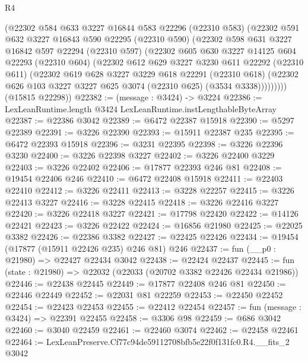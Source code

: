 \begin{lexlean}{R4}
\begin{coremodule}
        (@22302
          @584
          @633
          @3227
          @16844
          @583
          @22296
          (@22310 @583)
          (@22302
            @591
            @632
            @3227
            @16843
            @590
            @22295
            (@22310 @590)
            (@22302
              @598
              @631
              @3227
              @16842
              @597
              @22294
              (@22310 @597)
              (@22302
                @605
                @630
                @3227
                @14125
                @604
                @22293
                (@22310 @604)
                (@22302
                  @612
                  @629
                  @3227
                  @3230
                  @611
                  @22292
                  (@22310 @611)
                  (@22302
                    @619
                    @628
                    @3227
                    @3229
                    @618
                    @22291
                    (@22310 @618)
                    (@22302 @626 @103 @3227 @3227 @625 @3074 (@22310 @625) (@3534 @3338)))))))))
      (@15815 @22298))
@22382 := (message : @3424) -> @3224
@22386 := LexLeanRuntime.length @3424 LexLeanRuntime.instLengthableByteArray
@22387 := @22386 @3042
@22389 := @6472 @22387 @15918
@22390 := @5297 @22389
@22391 := @3226 @22390
@22393 := @15911 @22387 @235
@22395 := @6472 @22393 @15918
@22396 := @3231 @22395
@22398 := @3226 @22396 @3230
@22400 := @3226 @22398 @3227
@22402 := @3226 @22400 @3229
@22403 := @3226 @22402
@22406 := @17877 @22393 @246 @81
@22408 := @19454 @22406 @246
@22410 := @6472 @22408 @15918
@22411 := @22403 @22410
@22412 := @3226 @22411
@22413 := @3228 @22257
@22415 := @3226 @22413 @3227
@22416 := @3228 @22415
@22418 := @3226 @22416 @3227
@22420 := @3226 @22418 @3227
@22421 := @17798 @22420
@22422 := @14126 @22421
@22423 := @3226 @22422
@22424 := @16856 @21980
@22425 := @22025 @3382
@22426 := @22386 @3382
@22427 := @22425 @22426
@22434 := @19454 (@17877 (@15911 @22426 @235) @246 @81) @246
@22437 := fun (__p0 : @21980) => @22427 @22434 @3042
@22438 := @22424 @22437
@22445 := fun (state : @21980) => @22032 (@22033 (@20702 @3382 @22426 @22434 @21986))
@22446 := @22438 @22445
@22449 := @17877 @22408 @246 @81
@22450 := @22446 @22449
@22452 := @22031 @81 @22259
@22453 := @22450 @22452
@22454 := @22423 @22453
@22455 := @22412 @22454
@22457 := fun (message : @3424) => @22391 @22455
@22458 := @3306 @98
@22459 := @686 @3042
@22460 := @3040 @22459
@22461 := @22460 @3074
@22462 := @22458 @22461
@22464 := LexLeanPreserve.Cf77c94de59112708bfb5e22f0f131fc0.R4.__fits_2 @3042

\end{coremodule}
\end{lexlean}
